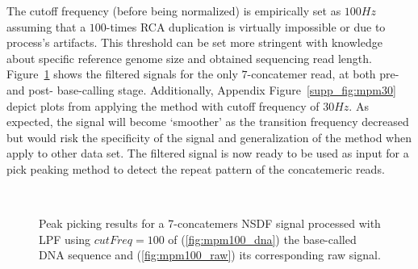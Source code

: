 The cutoff frequency (before being normalized) is empirically set as $100Hz$ assuming that a $100$-times RCA duplication is virtually impossible or due to process's artifacts.
This threshold can be set more stringent with knowledge about specific reference genome size and obtained sequencing read length. 
Figure~\ref{fig:mpm100} shows the filtered signals for the only $7$-concatemer read, at both pre- and post- base-calling stage. 
Additionally, Appendix Figure~\ref{supp_fig:mpm30} depict plots from applying the method with cutoff frequency of $30Hz$.
As expected, the signal will become `smoother' as the transition frequency decreased but would risk the specificity of the signal and generalization of the method when apply to other data set.
The filtered signal is now ready to be used as input for a pick peaking method to detect the repeat pattern of the concatemeric reads.
\begin{figure}[!hpt]
\centering
{}
\\
\caption[Peak picking for a 7-concatemers NSDF signal processed with LPF using $cutFreq=100$]{Peak picking results for a 7-concatemers NSDF signal processed with LPF using $cutFreq=100$ of (\ref{fig:mpm100_dna}) the base-called DNA sequence and (\ref{fig:mpm100_raw}) its corresponding raw signal.}
\label{fig:mpm100}
\end{figure}

